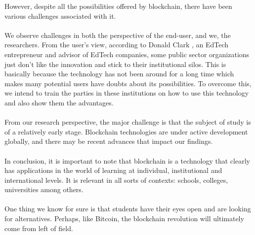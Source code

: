 However, despite all the possibilities offered by blockchain, there have been various challenges associated with it.\\\\
We observe challenges in both the perspective of the end-user, and we, the researchers. From the user’s view, according to Donald Clark \cite{art11}, an EdTech entrepreneur and advisor of EdTech companies, some public sector organizations just don’t like the innovation and stick to their institutional silos. This is basically because the technology has not been around for a long time which makes many potential users have doubts about its possibilities. To overcome this, we intend to train the parties in these institutions on how to use this technology and also show them the advantages.\\\\
From our research perspective, the major challenge is that the subject of study is of a relatively early stage. Blockchain technologies are under active development globally, and there may be recent advances that impact our findings.\\\\
In conclusion, it is important to note that blockchain is a technology that clearly has applications in the world of learning at individual, institutional and international levels. It is relevant in all sorts of contexts: schools, colleges, universities among others.\\\\
One thing we know for sure is that students have their eyes open and are looking for alternatives. Perhaps, like Bitcoin, the blockchain revolution will ultimately come from left of field.
\newpage

